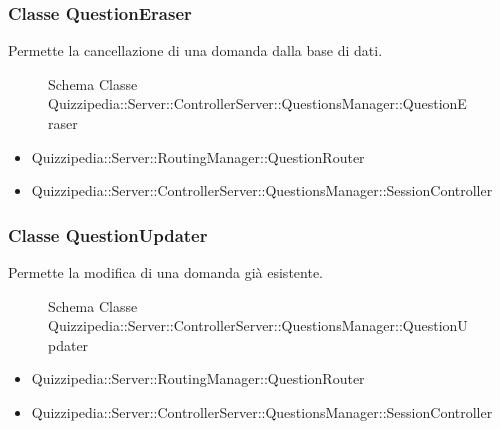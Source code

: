 \subsubsection{Classe QuestionEraser}
Permette la cancellazione di una domanda dalla base di dati.
\begin{figure}[H]
\centering
\noindent{}
\caption[Schema Classe QuestionEraser]{Schema Classe Quizzipedia::Server::ControllerServer::QuestionsManager::QuestionEraser}
\end{figure}
\begin{itemize}
\item Quizzipedia::Server::RoutingManager::QuestionRouter
\end{itemize}
\begin{itemize}
\item Quizzipedia::Server::ControllerServer::QuestionsManager::SessionController
\end{itemize}
\subsubsection{Classe QuestionUpdater}
Permette la modifica di una domanda già esistente.
\begin{figure}[H]
\centering
\noindent{}
\caption[Schema Classe QuestionUpdater]{Schema Classe Quizzipedia::Server::ControllerServer::QuestionsManager::QuestionUpdater}
\end{figure}
\begin{itemize}
\item Quizzipedia::Server::RoutingManager::QuestionRouter
\end{itemize}
\begin{itemize}
\item Quizzipedia::Server::ControllerServer::QuestionsManager::SessionController
\end{itemize}
